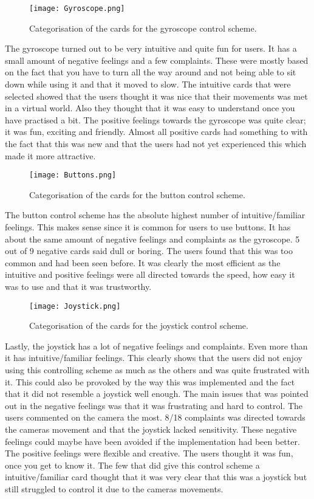 \begin{figure}[H]
\centering
\texttt{[image: Gyroscope.png]}
\caption{Categorisation of the cards for the gyroscope control scheme.}
\end{figure}

The gyroscope turned out to be very intuitive and quite fun for users. It has a small amount of negative feelings and a few complaints. These were mostly based on the fact that you have to turn all the way around and not being able to sit down while using it and that it moved to slow. 
The intuitive cards that were selected showed that the users thought it was nice that their movements was met in a virtual world. Also they thought that it was easy to understand once you have practised a bit. The positive feelings towards the gyroscope was quite clear; it was fun, exciting and friendly. Almost all positive cards had something to with the fact that this was new and that the users had not yet experienced this which made it more attractive.

\begin{figure}[H]
\centering
\texttt{[image: Buttons.png]}
\caption{Categorisation of the cards for the button control scheme.}
\end{figure}

The button control scheme has the absolute highest number of intuitive/familiar feelings. This makes sense since it is common for users to use buttons. 
It has about the same amount of negative feelings and complaints as the gyroscope. 5 out of 9 negative cards said dull or boring. The users found that this was too common and had been seen before. It was clearly the most efficient as the intuitive and positive feelings were all directed towards the speed, how easy it was to use and that it was trustworthy. 

\begin{figure}[H]
\centering
\texttt{[image: Joystick.png]}
\caption{Categorisation of the cards for the joystick control scheme.}
\label{joystickEvaluationResults}
\end{figure}

Lastly, the joystick has a lot of negative feelings and complaints. Even more than it has intuitive/familiar feelings. This clearly shows that the users did not enjoy using this controlling scheme as much as the others and was quite frustrated with it. This could also be provoked by the way this was implemented and the fact that it did not resemble a joystick well enough. The main issues that was pointed out in the negative feelings was that it was frustrating and hard to control. The users commented on the camera the most. 8/18 complaints was directed towards the cameras movement and that the joystick lacked sensitivity. These negative feelings could maybe have been avoided if the implementation had been better. The positive feelings were flexible and creative. The users thought it was fun, once you get to know it. 
The few that did give this control scheme a intuitive/familiar card thought that it was very clear that this was a joystick but still struggled to control it due to the cameras movements.

